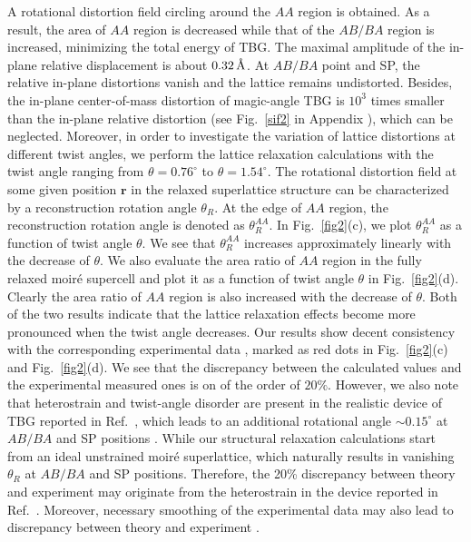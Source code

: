 \documentclass[aps,prx,10pt,twocolumn,superscriptaddress]{revtex4}
\def\III{{\uppercase\expandafter{\romannumeral 3}}}
\def\angstrom{\mbox{\normalfont\AA}}
\def\angstrom{\mbox{\normalfont\AA}}
\begin{document}
A rotational distortion field circling around the $AA$ region is obtained. As a result, the area of $AA$ region is decreased while that of the $AB/BA$ region is increased, minimizing the total energy of TBG. The maximal amplitude of the in-plane relative displacement is about $0.32\,\angstrom$. At $AB/BA$ point and SP, the relative in-plane distortions vanish and the lattice remains undistorted. Besides, the in-plane center-of-mass distortion of magic-angle TBG is $10^{3}$ times smaller than the in-plane relative distortion (see Fig.~\ref{sif2} in Appendix \III), which can be neglected.
Moreover, in order to investigate the variation of lattice distortions at different twist angles, we perform the lattice relaxation calculations with the twist angle ranging from $\theta\!=\!0.76^{\circ}$ to $\theta\!=\!1.54^{\circ}$.  The rotational distortion field at some given position $\mathbf{r}$ in the relaxed superlattice structure can be characterized  by a reconstruction rotation angle $\theta_R$.  At the edge of $AA$ region, the reconstruction rotation angle is denoted as $\theta^{AA}_R$.
In Fig.~\ref{fig2}(c),  we plot $\theta^{AA}_{R}$  as a function of twist angle  $\theta$. 
We see that $\theta^{AA}_R$ increases approximately linearly with the decrease of $\theta$.  We also evaluate the area ratio of $AA$ region in the fully relaxed moir\'e supercell and plot it as a function of twist angle $\theta$ in Fig.~\ref{fig2}(d). 
Clearly the area ratio of $AA$ region is also increased with the decrease of $\theta$. 
Both of the two results indicate that the lattice relaxation effects become more pronounced when the twist angle decreases. Our results show decent consistency with the corresponding experimental data \cite{kazmierczak2021strain}, marked as red dots in Fig.~\ref{fig2}(c) and Fig.~\ref{fig2}(d). We see that the discrepancy between the calculated values and the experimental measured ones  is on of the order of $20\%$. However, we also note that heterostrain and twist-angle disorder are present in the realistic device of TBG reported in Ref.~, which leads to an additional rotational angle $\sim 0.15^{\circ}$ at $AB/BA$ and SP positions \cite{kazmierczak2021strain}. While our structural relaxation calculations start from an ideal unstrained moir\'e superlattice, which naturally results in vanishing $\theta_R$ at $AB/BA$ and SP positions.
Therefore, the 20\% discrepancy between theory and experiment  may originate from the heterostrain in the device reported in Ref.~. Moreover, necessary smoothing of the experimental data may also lead  to  discrepancy between theory and experiment \cite{kazmierczak2021strain}.
\end{document}
